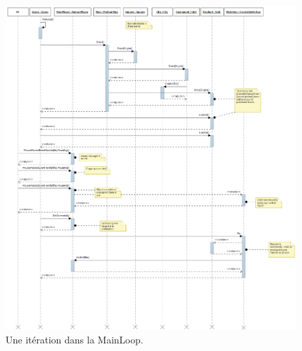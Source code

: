\begin{figure}
    \begin{center}  
    \includegraphics[width=\textwidth]{frame.png}
    \caption{Une itération dans la MainLoop.}
    \label{frame}
\end{center}
\end{figure}




































